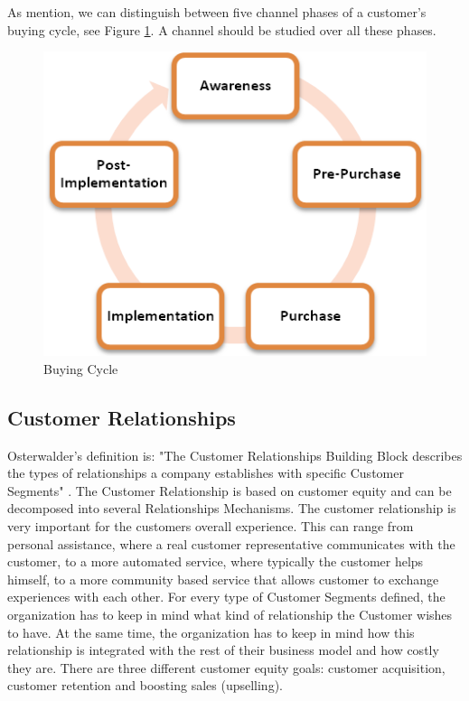 As mention, we can distinguish between five channel phases of a customer's buying cycle, see Figure \ref{fig:BuyingCycle}. A channel should be studied over all these phases.

\begin{figure}[h]
\caption[BuyingCycle]{Buying Cycle}
\label{fig:BuyingCycle}
\begin{center}
\includegraphics[scale=1.0]{5BuyingStages.png}
\end{center}
\end{figure} 

\newpage
\subsection{Customer Relationships}
Osterwalder's definition is: "The Customer Relationships Building Block describes the types of relationships a company establishes with specific Customer Segments" \cite{osterwalder}. The Customer Relationship is based on customer equity and can be decomposed into several Relationships Mechanisms. The customer relationship is very important for the customers overall experience. This can range from personal assistance, where a real customer representative communicates with the customer, to a more automated service, where typically the customer helps himself,  to a more community based service that allows customer to exchange experiences with each other. For every type of Customer Segments defined, the organization has to keep in mind what kind of relationship the Customer wishes to have. At the same time, the organization has to keep in mind how this relationship is integrated with the rest of their business model and how costly they are. There are three different customer equity goals: customer acquisition, customer retention and boosting sales (upselling).

